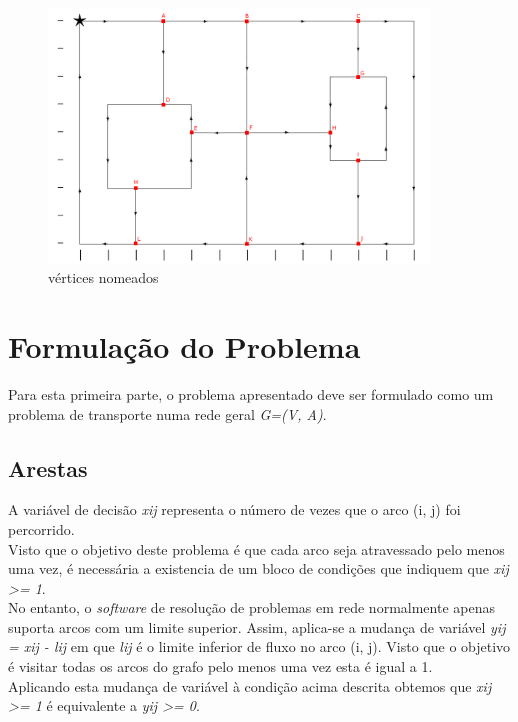 \documentclass[a4paper]{report}
\begin{document}
\begin{figure}[H]
    \begin{center}
        \includegraphics[width=0.9\textwidth]{images/desafioLetras.png}\par
        \caption{vértices nomeados}
        \label{fig:named}
    \end{center}
\end{figure}

\pagebreak
\section{Formulação do Problema}
Para esta primeira parte, o problema apresentado deve ser formulado como um
problema de transporte numa rede geral \textit{G=(V, A)}.

\subsection{Arestas}
A variável de decisão \textit{xij} representa o número de vezes que o arco (i,
j) foi percorrido.\\
Visto que o objetivo deste problema é que cada arco seja atravessado pelo menos
uma vez, é necessária a existencia de um bloco de condições que indiquem que
\textit{xij >= 1}.\\
No entanto, o \textit{software} de resolução de problemas em rede normalmente
apenas suporta arcos com um limite superior. Assim, aplica-se a mudança de
variável \textit{yij = xij - lij} em que \textit{lij} é o limite inferior de
fluxo no arco (i, j). Visto que o objetivo é visitar todas os arcos do grafo
pelo menos uma vez esta é igual a 1.\\
Aplicando esta mudança de variável à condição acima descrita obtemos que
\textit{xij >= 1} é equivalente a \textit{yij >= 0}.
\end{document}
